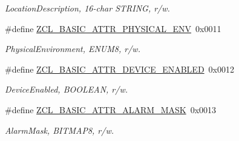 \begin{DoxyCompactItemize}
\begin{DoxyCompactList}\small\item\em Location\+Description, 16-\/char S\+T\+R\+I\+NG, r/w. \end{DoxyCompactList}\item 
\mbox{\label{group__zcl__basic_gafcbb476a4db9587ae36001a2dcd417fd}} 
\#define \hyperlink{group__zcl__basic_gafcbb476a4db9587ae36001a2dcd417fd}{Z\+C\+L\+\_\+\+B\+A\+S\+I\+C\+\_\+\+A\+T\+T\+R\+\_\+\+P\+H\+Y\+S\+I\+C\+A\+L\+\_\+\+E\+NV}~0x0011
\begin{DoxyCompactList}\small\item\em Physical\+Environment, E\+N\+U\+M8, r/w. \end{DoxyCompactList}\item 
\mbox{\label{group__zcl__basic_gaf47c5e3169d58b3a323a7235636e1896}} 
\#define \hyperlink{group__zcl__basic_gaf47c5e3169d58b3a323a7235636e1896}{Z\+C\+L\+\_\+\+B\+A\+S\+I\+C\+\_\+\+A\+T\+T\+R\+\_\+\+D\+E\+V\+I\+C\+E\+\_\+\+E\+N\+A\+B\+L\+ED}~0x0012
\begin{DoxyCompactList}\small\item\em Device\+Enabled, B\+O\+O\+L\+E\+AN, r/w. \end{DoxyCompactList}\item 
\mbox{\label{group__zcl__basic_gac9970c5f20b4fd743af8c71653e2d78a}} 
\#define \hyperlink{group__zcl__basic_gac9970c5f20b4fd743af8c71653e2d78a}{Z\+C\+L\+\_\+\+B\+A\+S\+I\+C\+\_\+\+A\+T\+T\+R\+\_\+\+A\+L\+A\+R\+M\+\_\+\+M\+A\+SK}~0x0013
\begin{DoxyCompactList}\small\item\em Alarm\+Mask, B\+I\+T\+M\+A\+P8, r/w. \end{DoxyCompactList}\end{DoxyCompactItemize}
\label{_amgrp01747264fe7bf50731df0522c351974e}%

